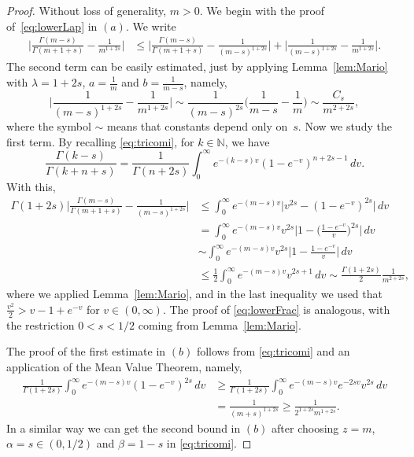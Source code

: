 \documentclass[a4paper,11pt,reqno]{amsart}
\newcommand{\N}{\mathbb{N}}
\theoremstyle{definition}
\numberwithin{equation}{section}
\begin{document}
\begin{proof}
Without loss of generality, $m>0$. We begin with the proof of~\eqref{eq:lowerLap} in $(a)$.  We write
\begin{align*}
\bigg|\frac{\Gamma(m-s)}{\Gamma(m+1+s)}-\frac{1}{m^{1+2s}}\bigg|
&\le\bigg|\frac{\Gamma(m-s)}{\Gamma(m+1+s)}-\frac{1}{(m-s)^{1+2s}}\bigg| +\bigg|\frac{1}{(m-s)^{1+2s}}-\frac{1}{m^{1+2s}}\bigg|.
\end{align*}
The second term can be easily estimated, just by applying Lemma~\ref{lem:Mario}
with $\lambda=1+2s$, $a=\frac{1}{m}$ and $b=\frac{1}{m-s}$, namely,
\[
\bigg|\frac{1}{(m-s)^{1+2s}}-\frac{1}{m^{1+2s}}\bigg|
\sim\frac{1}{(m-s)^{2s}}\bigg(\frac{1}{m-s}-\frac{1}{m}\bigg)\sim\frac{C_{s}}{m^{2+2s}},
\]
where the symbol $\sim$ means that constants depend only on~$s$.
Now we study the first term.
By recalling \eqref{eq:tricomi}, for $k\in \N$, we have
$$
\frac{\Gamma(k-s)}{\Gamma(k+n+s)}
= \frac{1}{\Gamma(n+2s)}\int_0^{\infty}e^{-(k-s)v}(1-e^{-v})^{n+2s-1}\,dv.
$$
With this,
\begin{align*}
\Gamma(1+2s)\bigg|\frac{\Gamma(m-s)}{\Gamma(m+1+s)}-\frac{1}{(m-s)^{1+2s}}\bigg|
&\le \int_0^{\infty}e^{-(m-s)v}\big|v^{2s}-(1-e^{-v})^{2s}\big|\,dv\\
&= \int_0^{\infty}e^{-(m-s)v}v^{2s}\bigg|1-\Big(\frac{1-e^{-v}}{v}\Big)^{2s}\bigg|\,dv\\
&\sim \int_0^{\infty}e^{-(m-s)v}v^{2s}\bigg|1-\frac{1-e^{-v}}{v}\bigg|\,dv\\\
&\le \frac12\int_0^{\infty}e^{-(m-s)v}v^{2s+1}\,dv\sim\frac{\Gamma(1+2s)}{2}\frac{1}{m^{2+2s}},
\end{align*}
where we applied Lemma~\ref{lem:Mario},
and in the last inequality we used that $\frac{v^2}{2}>v-1+e^{-v}$ for $v\in (0,\infty)$.
The proof of \eqref{eq:lowerFrac} is analogous, with the restriction $0<s<1/2$ coming from Lemma~\ref{lem:Mario}.

The proof of the first estimate in $(b)$
follows from \eqref{eq:tricomi} and an application of the Mean Value Theorem, namely,
\begin{align*}
\frac{1}{\Gamma(1+2s)}\int_0^{\infty}e^{-(m-s)v}(1-e^{-v})^{2s}\,dv&\ge \frac{1}{\Gamma(1+2s)}\int_0^{\infty}e^{-(m-s)v}e^{-2sv}v^{2s}\,dv\\
&=\frac{1}{(m+s)^{1+2s}}\ge\frac{1}{2^{1+2s}m^{1+2s}}.
\end{align*}
In a similar way we can get the second bound in $(b)$ after choosing
$z=m$, $\alpha=s\in(0,1/2)$ and $\beta=1-s$ in \eqref{eq:tricomi}.
\end{proof}
\end{document}
